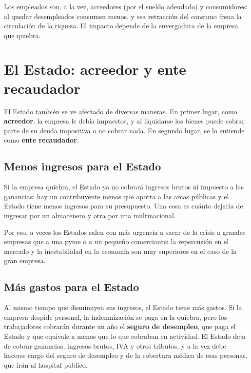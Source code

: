 \documentclass[12pt,oneside]{book}
\begin{document}
\begin{important}
Los empleados son, a la vez, acreedores (por el sueldo adeudado) y consumidores: al quedar desempleados consumen menos, y esa retracción del consumo frena la circulación de la riqueza. El impacto depende de la envergadura de la empresa que quiebra.
\end{important}

\section{El Estado: acreedor y ente recaudador}

El Estado también se ve afectado de diversas maneras. En primer lugar, como \textbf{acreedor}: la empresa le debía impuestos, y al liquidarse los bienes puede cobrar parte de su deuda impositiva o no cobrar nada. En segundo lugar, se lo entiende como \textbf{ente recaudador}.

\subsection{Menos ingresos para el Estado}

Si la empresa quiebra, el Estado ya no cobrará ingresos brutos ni impuesto a las ganancias: hay un contribuyente menos que aporta a las arcas públicas y el Estado tiene menos ingresos para su presupuesto. Una cosa es cuánto dejaría de ingresar por un almacenero y otra por una multinacional.

Por eso, a veces los Estados salen con más urgencia a sacar de la crisis a grandes empresas que a una pyme o a un pequeño comerciante: la repercusión en el mercado y la inestabilidad en la economía son muy superiores en el caso de la gran empresa.

\subsection{Más gastos para el Estado}

Al mismo tiempo que disminuyen sus ingresos, el Estado tiene más gastos. Si la empresa despide personal, la indemnización se paga en la quiebra, pero los trabajadores cobrarán durante un año el \textbf{seguro de desempleo}, que paga el Estado y que equivale a menos que lo que cobraban en actividad. El Estado deja de cobrar ganancias, ingresos brutos, IVA y otros tributos, y a la vez debe hacerse cargo del seguro de desempleo y de la cobertura médica de esas personas, que irán al hospital público.
\end{document}
